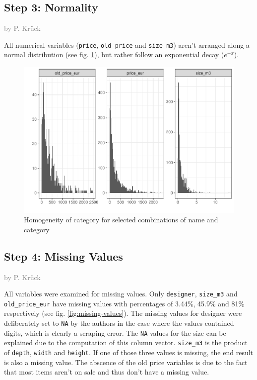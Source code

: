 \documentclass[a4paper, nobind]{templates/ociamthesis}
\begin{document}
\hypertarget{step-3-normality}{%
\subsection{Step 3: Normality}\label{step-3-normality}}

\textcolor{gray}{by P. Krück}

All numerical variables (\texttt{price}, \texttt{old\_price} and \texttt{size\_m3}) aren't arranged along a normal distribution (see fig. \ref{fig:normality}), but rather follow an exponential decay (\(e^{-x}\)).

\begin{figure}
\includegraphics[width=1\linewidth]{_main_files/figure-latex/normality-1} \caption{Homogeneity of category for selected combinations of name and category}\label{fig:normality}
\end{figure}

\hypertarget{step-4-missing-values}{%
\subsection{Step 4: Missing Values}\label{step-4-missing-values}}

\textcolor{gray}{by P. Krück}

All variables were examined for missing values. Only \texttt{designer}, \texttt{size\_m3} and \texttt{old\_price\_eur} have missing values with percentages of 3.44\%, 45.9\% and 81\% respectively (see fig. \ref{fig:missing-values}).
The missing values for designer were deliberately set to \texttt{NA} by the authors in the case where the values contained digits, which is clearly a scraping error.
The \texttt{NA} values for the size can be explained due to the computation of this column vector. \texttt{size\_m3} is the product of \texttt{depth}, \texttt{width} and \texttt{height}. If one of those three values is missing, the end result is also a missing value.
The abscence of the old price variables is due to the fact that most items aren't on sale and thus don't have a missing value.
\end{document}
